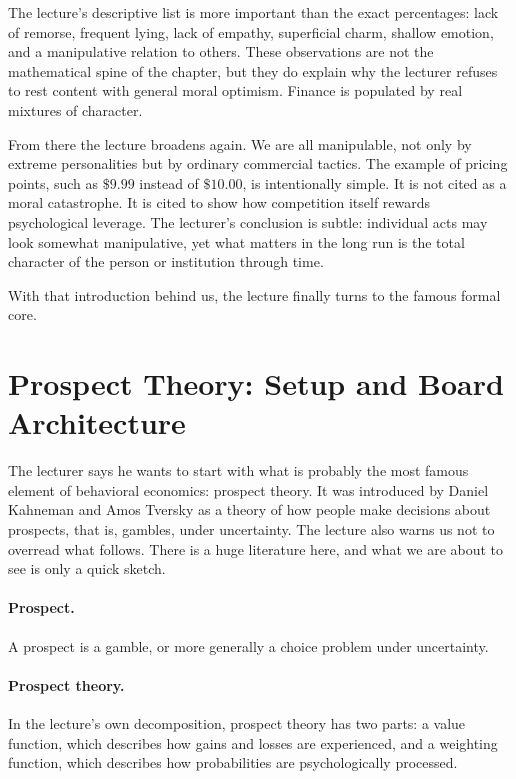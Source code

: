 The lecture's descriptive list is more important than the exact percentages: lack of remorse, frequent lying, lack of empathy, superficial charm, shallow emotion, and a manipulative relation to others. These observations are not the mathematical spine of the chapter, but they do explain why the lecturer refuses to rest content with general moral optimism. Finance is populated by real mixtures of character.

From there the lecture broadens again. We are all manipulable, not only by extreme personalities but by ordinary commercial tactics. The example of pricing points, such as \(\$9.99\) instead of \(\$10.00\), is intentionally simple. It is not cited as a moral catastrophe. It is cited to show how competition itself rewards psychological leverage. The lecturer's conclusion is subtle: individual acts may look somewhat manipulative, yet what matters in the long run is the total character of the person or institution through time.

With that introduction behind us, the lecture finally turns to the famous formal core.

\section{Prospect Theory: Setup and Board Architecture}

The lecturer says he wants to start with what is probably the most famous element of behavioral economics: prospect theory. It was introduced by Daniel Kahneman and Amos Tversky as a theory of how people make decisions about prospects, that is, gambles, under uncertainty. The lecture also warns us not to overread what follows. There is a huge literature here, and what we are about to see is only a quick sketch.

\paragraph{Prospect.} A prospect is a gamble, or more generally a choice problem under uncertainty.

\paragraph{Prospect theory.} In the lecture's own decomposition, prospect theory has two parts: a value function, which describes how gains and losses are experienced, and a weighting function, which describes how probabilities are psychologically processed.

